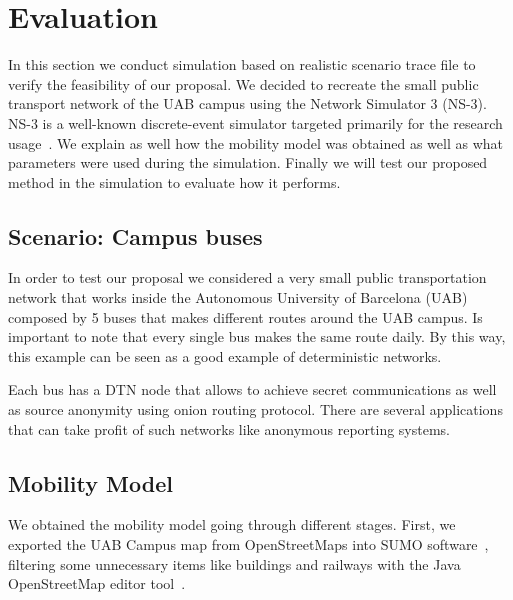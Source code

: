 \section{Evaluation}\label{sec:evaluation}


In this section we conduct simulation based on realistic scenario trace file to verify the feasibility of our proposal. We decided to recreate the small public transport network of the UAB campus using the Network Simulator 3 (NS-3). NS-3 is a well-known discrete-event simulator targeted primarily for the research usage~\cite{ns-3-webpage}. We explain as well how the mobility model was obtained as well as what parameters were used during the simulation. Finally we will test our proposed method in the simulation to evaluate how it performs.

\subsection{Scenario: Campus buses}


In order to test our proposal we considered a very small public transportation network that works inside the Autonomous University of Barcelona (UAB) composed by 5 buses that makes different routes around the UAB campus. Is important to note that every single bus makes the same route daily. By this way, this example can be seen as a good example of deterministic networks.

Each bus has a DTN node that allows to achieve secret communications as well as source anonymity using onion routing protocol. There are several applications that can take profit of such networks like anonymous reporting systems.

\subsection{Mobility Model}


We obtained the mobility model going through different stages. First, we exported the UAB Campus map from OpenStreetMaps into SUMO software~\cite{sumo}, filtering some unnecessary items like buildings and railways with the Java OpenStreetMap editor tool~\cite{josm}.

